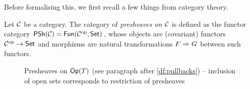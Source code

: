         Before formalising this, we first recall a few things from category theory.
        
        \begin{definition}[Presheaves]\label{df:presheaves}
            Let $\mathcal{C}$ be a category.
            The category of \emph{presheaves on $\mathcal{C}$} is defined as the functor category $\mathsf{PSh}(\mathcal{C})=\mathsf{Fun}({\mathcal{C}}^{\mathrm{op}},\mathsf{Set})$, whose objects are (covariant) functors ${\mathcal{C}}^{\mathrm{op}}\to\mathsf{Set}$ and morphisms are natural transformations $F\Rightarrow G$ between such functors.
        \end{definition}


        \begin{figure}[h]
            \centering
            \caption{Presheaves on $\mathsf{Op}(T)$ (see paragraph after \cref{df:pullbacks}) -- inclusion of open sets corresponds to restriction of presheaves}\label{fg:presheaves}
        \end{figure}

